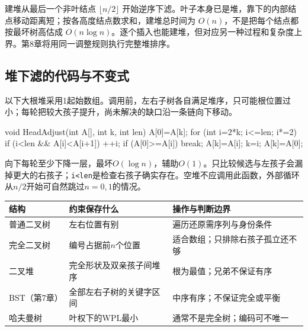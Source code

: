 建堆从最后一个非叶结点 \(\lfloor n/2\rfloor\) 开始逆序下滤。叶子本身已是堆，靠下的内部结点移动距离短；按各高度结点数求和，建堆总时间为 \(O(n)\)，不是把每个结点都按最坏树高估成 \(O(n\log n)\)。逐个插入也能建堆，但对应另一种过程和复杂度上界。第8章将用同一调整规则执行完整堆排序。

\subsection{堆下滤的代码与不变式}\label{DS05-sift}

以下大根堆采用1起始数组。调用前，左右子树各自满足堆序，只可能根位置过小；每轮把较大孩子提升，尚未解决的缺口沿一条链向下移动。

\par\medskip\noindent\begin{minipage}{\linewidth}
\begin{codeblock}[language=C++]
void HeadAdjust(int A[], int k, int len) {
    A[0]=A[k];
    for (int i=2*k; i<=len; i*=2) {
        if (i<len && A[i]<A[i+1]) ++i;
        if (A[0]>=A[i]) break;
        A[k]=A[i]; k=i;
    }
    A[k]=A[0];
}
\end{codeblock}
\end{minipage}\par\medskip

向下每轮至少下降一层，最坏\(O(\log n)\)，辅助\(O(1)\)。只比较候选与左孩子会漏掉更大的右孩子；\texttt{i<\allowbreak{}len}是检查右孩子确实存在。空堆不应调用此函数，外部循环从\(n/2\)开始可自然跳过\(n=0,1\)的情况。

\begin{wideblock}

\par\medskip\noindent\begin{minipage}{\linewidth}\fontsize{9.3}{12}\selectfont\begin{tabularx}{\linewidth}{@{}YYY@{}}
\toprule\noalign{}
结构 & 约束保存什么 & 操作与判断边界 \\
\midrule\noalign{}


普通二叉树 & 左右位置有别 & 遍历还原需序列与身份条件 \\
完全二叉树 & 编号占据前\(n\)个位置 & 适合数组；只排除右孩子孤立还不够 \\
二叉堆 & 完全形状及双亲孩子间堆序 & 根为最值；兄弟不保证有序 \\
BST（第7章） & 全部左右子树的关键字区间 & 中序有序；不保证完全或平衡 \\
哈夫曼树 & 叶权下的WPL最小 & 通常不是完全树；编码可不唯一 \\
\bottomrule\end{tabularx}
\end{minipage}\par\medskip

\end{wideblock}

